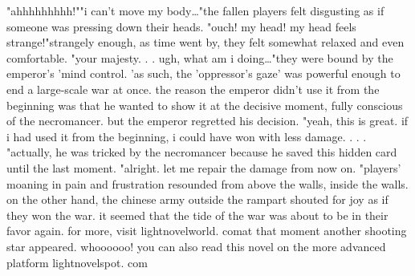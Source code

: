 "ahhhhhhhhh!""i can't move my body…"the fallen players felt disgusting as if someone was pressing down their heads.
"ouch! my head! my head feels strange!"strangely enough, as time went by, they felt somewhat relaxed and even comfortable.
 "your majesty.
.
.
 ugh, what am i doing…"they were bound by the emperor's 'mind control.
'as such, the 'oppressor's gaze' was powerful enough to end a large-scale war at once.
the reason the emperor didn't use it from the beginning was that he wanted to show it at the decisive moment, fully conscious of the necromancer.
 but the emperor regretted his decision.
 "yeah, this is great.
 if i had used it from the beginning, i could have won with less damage.
.
.
.
"actually, he was tricked by the necromancer because he saved this hidden card until the last moment.
 "alright.
 let me repair the damage from now on.
"players' moaning in pain and frustration resounded from above the walls, inside the walls.
on the other hand, the chinese army outside the rampart shouted for joy as if they won the war.
 it seemed that the tide of the war was about to be in their favor again.
for more, visit lightnovelworld.
c­omat that moment another shooting star appeared.
whoooooo! you can also read this novel on the more advanced platform lightnovelspot.
com

 